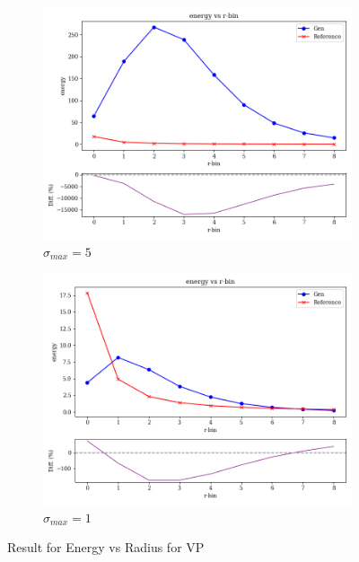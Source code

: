 \begin{figure}[bthp]
\begin{subfigure}[b]{0.23\textwidth}
        \centering
        \includegraphics[width=\textwidth]{Figures/vp5_2.png}
        \caption{$\sigma_{max}=5$}
        \label{fig:vp5_2}
    \end{subfigure}
    \hfill
    \begin{subfigure}[b]{0.23\textwidth}  %
        \centering
        \includegraphics[width=\textwidth]{Figures/vp1_2.png}
        \caption{$\sigma_{max}=1$}
        \label{fig:vp1_2}
    \end{subfigure}
    \caption{Result for Energy vs Radius for VP}
\end{figure}

